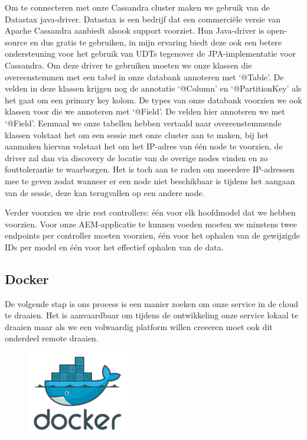 \documentclass{article}
\begin{document}
\par
Om te connecteren met onze Cassandra cluster maken we gebruik van de Datastax java-driver. Datastax is een bedrijf dat een commerciële versie van Apache Cassandra aanbiedt alsook support voorziet. Hun Java-driver is open-source en dus gratis te gebruiken, in mijn ervaring biedt deze ook een betere ondersteuning voor het gebruik van UDTs tegenover de JPA-implementatie voor Cassandra. Om deze driver te gebruiken moeten we onze klassen die overeenstemmen met een tabel in onze databank annoteren met ‘@Table’. De velden in deze klassen krijgen nog de annotatie ‘@Column’ en ‘@PartitionKey’ als het gaat om een primary key kolom. De types van onze databank voorzien we ook klassen voor die we annoteren met ‘@Field’. De velden hier annoteren we met ‘@Field’. Eenmaal we onze tabellen hebben vertaald naar overeenstemmende klassen volstaat het om een sessie met onze cluster aan te maken, bij het aanmaken hiervan volstaat het om het IP-adres van één node te voorzien, de driver zal dan via discovery de locatie van de overige nodes vinden en zo fouttolerantie te waarborgen. Het is toch aan te raden om meerdere IP-adressen mee te geven zodat wanneer er een node niet beschikbaar is tijdens het aangaan van de sessie, deze kan terugvallen op een andere node.
\par
Verder voorzien we drie rest controllers: één voor elk hoofdmodel dat we hebben voorzien. Voor onze AEM-applicatie te kunnen voeden moeten we minstens twee endpoints per controller moeten voorzien, één voor het ophalen van de gewijzigde IDs per model en één voor het effectief ophalen van de data. 
	\subsection{Docker}
	De volgende stap is ons process is een manier zoeken om onze service in de cloud te draaien. Het is aanvaardbaar om tijdens de ontwikkeling onze service lokaal te draaien maar als we een volwaardig platform willen creeeren moet ook dit onderdeel remote draaien.
	\par
	\begin{figure}
  	\includegraphics[width=0.4\textwidth]{images/docker-logo.PNG}
	\end{figure}
	
\end{document}
